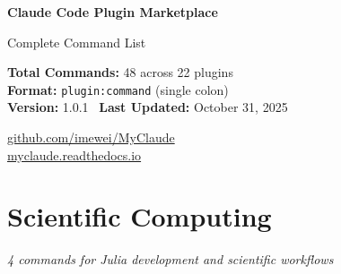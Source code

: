 \documentclass[11pt,a4paper]{article}
\begin{document}
\begin{titlepage}
    \centering
    \vspace*{2cm}

    {\Huge\bfseries\color{primarycolor}Claude Code Plugin Marketplace\par}
    \vspace{1cm}
    {\LARGE\color{secondarycolor}Complete Command List\par}
    \vspace{2cm}

    \begin{tcolorbox}[colback=tableheader,colframe=primarycolor,arc=3mm,boxrule=1pt]
        \centering
        \large
        \textbf{Total Commands:} 48 across 22 plugins\\[0.3cm]
        \textbf{Format:} \texttt{plugin:command} (single colon)\\[0.3cm]
        \textbf{Version:} 1.0.1 \textbar\ \textbf{Last Updated:} October 31, 2025
    \end{tcolorbox}

    \vfill

    {\large\color{secondarycolor}
     \href{https://github.com/imewei/MyClaude}{github.com/imewei/MyClaude}\\[0.3cm]
     \href{https://myclaude.readthedocs.io/en/latest/}{myclaude.readthedocs.io}
    \par}

    \vspace{1cm}
\end{titlepage}

\tableofcontents
\newpage

\section{Scientific Computing}
\textit{4 commands for Julia development and scientific workflows}
\end{document}
